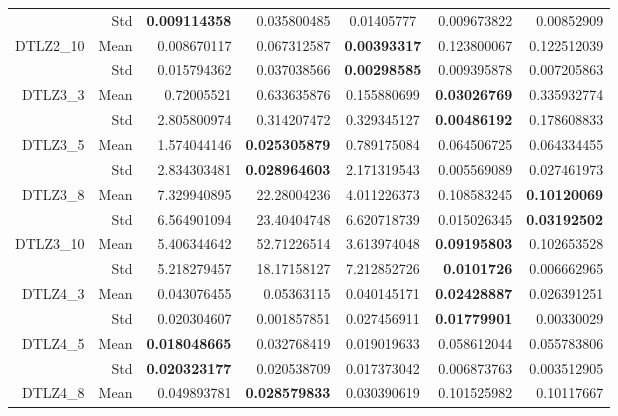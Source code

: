\begin{table*}[htbp]
\begin{tabular}{rrrrrrr}
          & Std   & \textbf{0.009114358} & 0.035800485 & \multicolumn{1}{c}{0.01405777} & 0.009673822 & 0.00852909 \\
    \multirow{2}[0]{*}{DTLZ2\_10} & Mean  & 0.008670117 & 0.067312587 & \multicolumn{1}{c}{\textbf{0.00393317}} & 0.123800067 & 0.122512039 \\
          & Std   & 0.015794362 & 0.037038566 & \multicolumn{1}{c}{\textbf{0.00298585}} & 0.009395878 & 0.007205863 \\
    \multirow{2}[0]{*}{DTLZ3\_3} & Mean  & 0.72005521 & 0.633635876 & \multicolumn{1}{c}{0.155880699} & \textbf{0.03026769} & 0.335932774 \\
          & Std   & 2.805800974 & 0.314207472 & \multicolumn{1}{c}{0.329345127} & \textbf{0.00486192} & 0.178608833 \\
    \multirow{2}[0]{*}{DTLZ3\_5} & Mean  & 1.574044146 & \textbf{0.025305879} & \multicolumn{1}{c}{0.789175084} & 0.064506725 & 0.064334455 \\
          & Std   & 2.834303481 & \textbf{0.028964603} & \multicolumn{1}{c}{2.171319543} & 0.005569089 & 0.027461973 \\
    \multirow{2}[0]{*}{DTLZ3\_8} & Mean  & 7.329940895 & 22.28004236 & \multicolumn{1}{c}{4.011226373} & 0.108583245 & \textbf{0.10120069} \\
          & Std   & 6.564901094 & 23.40404748 & \multicolumn{1}{c}{6.620718739} & 0.015026345 & \textbf{0.03192502} \\
    \multirow{2}[0]{*}{DTLZ3\_10} & Mean  & 5.406344642 & 52.71226514 & \multicolumn{1}{c}{3.613974048} & \textbf{0.09195803} & 0.102653528 \\
          & Std   & 5.218279457 & 18.17158127 & \multicolumn{1}{c}{7.212852726} & \textbf{0.0101726} & 0.006662965 \\
    \multirow{2}[0]{*}{DTLZ4\_3} & Mean  & 0.043076455 & 0.05363115 & \multicolumn{1}{c}{0.040145171} & \textbf{0.02428887} & 0.026391251 \\
          & Std   & 0.020304607 & 0.001857851 & \multicolumn{1}{c}{0.027456911} & \textbf{0.01779901} & 0.00330029 \\
    \multirow{2}[0]{*}{DTLZ4\_5} & Mean  & \textbf{0.018048665} & 0.032768419 & \multicolumn{1}{c}{0.019019633} & 0.058612044 & 0.055783806 \\
          & Std   & \textbf{0.020323177} & 0.020538709 & \multicolumn{1}{c}{0.017373042} & 0.006873763 & 0.003512905 \\
    \multirow{2}[0]{*}{DTLZ4\_8} & Mean  & 0.049893781 & \textbf{0.028579833} & \multicolumn{1}{c}{0.030390619} & 0.101525982 & 0.10117667 \\

\end{tabular}
\end{table*}
